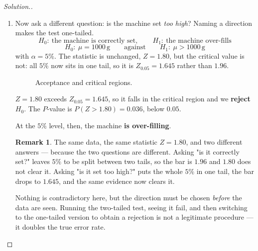 \documentclass[11pt,a4paper]{article}
\theoremstyle{definition}
\newtheorem{remark}[thm]{Remark}
\newenvironment{solution}
  {\renewcommand{\qedsymbol}{}\begin{proof}[\textit{Solution}.]}
  {\end{proof}}
\begin{document}
\begin{solution}
\begin{enumerate}
\begin{enumerate}
\textit{Interpretation}: our statistic $Z=1.80$ lies between $-1.96$ and $1.96$, in the acceptance region, so we \textbf{fail to reject} $H_0$. At the $5\%$ level there is no evidence that the machine is incorrectly set. The $P$-value is $2P(Z>1.80)=0.072$, just above $0.05$.
\end{enumerate}




\pagebreak
\item Now ask a different question: is the machine set \emph{too high}? Naming a direction
makes the test one-tailed.
\[H_0:\ \text{the machine is correctly set},\qquad H_1:\ \text{the machine over-fills}\]
\[H_0:\ \mu=1000\,\text{g}\qquad\text{against}\qquad H_1:\ \mu>1000\,\text{g}\]
with $\alpha=5\%$. The statistic is unchanged, $Z=1.80$, but the critical value is not:
all $5\%$ now sits in one tail, so it is $Z_{0.05}=1.645$ rather than $1.96$.




\begin{figure}[H]
\centering
{}
\caption{Acceptance and critical regions.}
\end{figure}







$Z=1.80$ exceeds $Z_{0.05}=1.645$, so it falls in the critical region and we \textbf{reject} $H_0$. The $P$-value is $P(Z>1.80)=0.036$, below $0.05$.

At the $5\%$ level, then, the machine \textbf{is over-filling}.
\begin{remark}
The same data, the same statistic $Z=1.80$, and two different answers --- because the two
questions are different. Asking "is it correctly set?" leaves $5\%$ to be split between two
tails, so the bar is $1.96$ and $1.80$ does not clear it. Asking "is it set too high?"
puts the whole $5\%$ in one tail, the bar drops to $1.645$, and the same evidence now clears
it.

Nothing is contradictory here, but the direction must be chosen \emph{before} the data are
seen. Running the two-tailed test, seeing it fail, and then switching to the one-tailed
version to obtain a rejection is not a legitimate procedure --- it doubles the true error
rate.
\end{remark}
\end{enumerate}
\end{solution}
\end{document}
